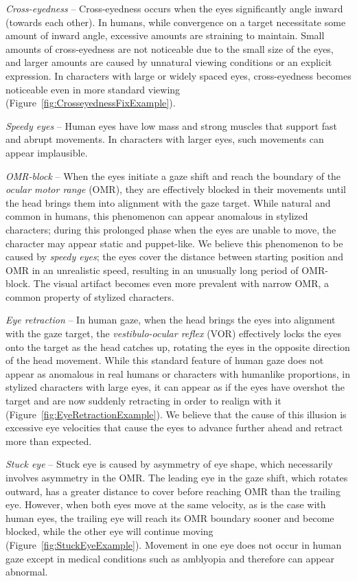 \noindent\emph{Cross-eyedness} -- Cross-eyedness occurs when the eyes significantly angle inward (towards each other). In humans, while convergence on a target necessitate some amount of inward angle, excessive amounts are straining to maintain. Small amounts of cross-eyedness are not noticeable due to the small size of the eyes, and larger amounts are caused by unnatural viewing conditions or an explicit expression. In characters with large or widely spaced eyes, cross-eyedness becomes noticeable even in more standard viewing (Figure~\ref{fig:CrosseyednessFixExample}).

\noindent\emph{Speedy eyes} -- Human eyes have low mass and strong muscles that support fast and abrupt movements. In characters with larger eyes, such movements can appear implausible.

\noindent\emph{OMR-block} %
--  When the eyes initiate a gaze shift and reach the boundary of the \textit{ocular motor range} (OMR), they are effectively blocked in their movements until the head brings them into alignment with the gaze target. While natural and common in humans, this phenomenon can appear anomalous in stylized characters; during this prolonged phase when the eyes are unable to move, the character may appear static and puppet-like. We believe this phenomenon to be caused by \textit{speedy eyes}; the eyes cover the distance between starting position and OMR in an unrealistic speed, resulting in an unusually long period of OMR-block. The visual artifact becomes even more prevalent with narrow OMR, a common property of stylized characters.

\noindent\emph{Eye retraction} -- In human gaze, when the head brings the eyes into alignment with the gaze target, the \textit{vestibulo-ocular reflex} (VOR) effectively locks the eyes onto the target as the head catches up, rotating the eyes in the opposite direction of the head movement. While this standard feature of human gaze does not appear as anomalous in real humans or characters with humanlike proportions, in stylized characters with large eyes, it can appear as if the eyes have overshot the target and are now suddenly retracting in order to realign with it (Figure~\ref{fig:EyeRetractionExample}). We believe that the cause of this illusion is excessive eye velocities that cause the eyes to advance further ahead and retract more than expected.

\noindent\emph{Stuck eye} -- Stuck eye is caused by asymmetry of eye shape, which necessarily involves asymmetry in the OMR. The leading eye in the gaze shift, which rotates outward, has a greater distance to cover before reaching OMR than the trailing eye. However, when both eyes move at the same velocity, as is the case with human eyes, the trailing eye will reach its OMR boundary sooner and become blocked, while the other eye will continue moving (Figure~\ref{fig:StuckEyeExample}). Movement in one eye does not occur in human gaze except in medical conditions such as amblyopia and therefore can appear abnormal.

